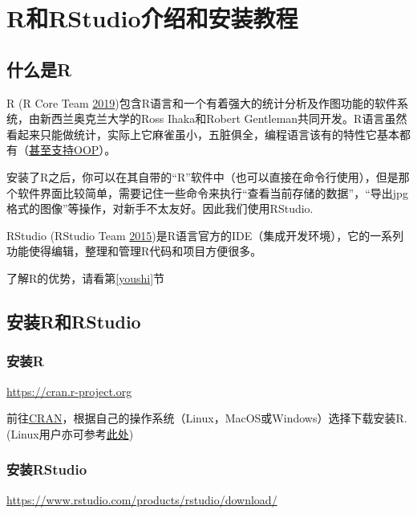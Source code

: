 \documentclass[]{book}
\begin{document}
\hypertarget{intro-and-installation}{%
\chapter{R和RStudio介绍和安装教程}\label{intro-and-installation}}

\hypertarget{r}{%
\section{什么是R}\label{r}}

R (R Core Team \protect\hyperlink{ref-R-base}{2019})包含R语言和一个有着强大的统计分析及作图功能的软件系统，由新西兰奥克兰大学的Ross Ihaka和Robert Gentleman共同开发。R语言虽然看起来只能做统计，实际上它麻雀虽小，五脏俱全，编程语言该有的特性它基本都有（\href{https://adv-r.hadley.nz/oo.html}{甚至支持OOP}）。

安装了R之后，你可以在其自带的``R''软件中（也可以直接在命令行使用），但是那个软件界面比较简单，需要记住一些命令来执行``查看当前存储的数据''，``导出jpg格式的图像''等操作，对新手不太友好。因此我们使用RStudio.

RStudio (RStudio Team \protect\hyperlink{ref-R-rstudio}{2015})是R语言官方的IDE（集成开发环境），它的一系列功能使得编辑，整理和管理R代码和项目方便很多。

了解R的优势，请看第\ref{youshi}节

\hypertarget{rrstudio}{%
\section{安装R和RStudio}\label{rrstudio}}

\hypertarget{r}{%
\subsection{安装R}\label{r}}

\url{https://cran.r-project.org}

前往\href{https://cran.r-project.org}{CRAN}，根据自己的操作系统（Linux，MacOS或Windows）选择下载安装R. (Linux用户亦可参考\href{https://blog.zenggyu.com/en/post/2018-01-29/installing-r-r-packages-e-g-tidyverse-and-rstudio-on-ubuntu-linux/}{此处})

\hypertarget{rstudio}{%
\subsection{安装RStudio}\label{rstudio}}

\url{https://www.rstudio.com/products/rstudio/download/}
\end{document}

